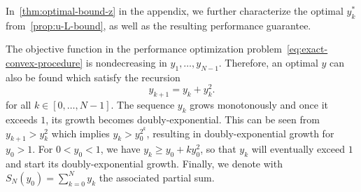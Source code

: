 \documentclass{article}
\begin{document}
In~\cref{thm:optimal-bound-z} in the appendix, we further characterize the optimal $y_k^*$ from~\cref{prop:u-L-bound}, as well as the resulting performance guarantee. 
\begin{toappendix}
The objective function in the performance optimization problem~\eqref{eq:exact-convex-procedure} is nondecreasing in $y_1,\dots,y_{N-1}$. Therefore, an optimal $y$ can also be found which satisfy the recursion
\begin{equation}\label{eq:y-recursion}
  y_{k+1}=y_k+y_k^2.
\end{equation}
for all $k\in [0, \dots, N-1]$.
The sequence $y_k$ grows monotonously and once it exceeds $1$, its growth becomes doubly-exponential. This can be seen from $y_{k+1}> y_{k}^2$ which implies $y_{k}>y_{0}^{2^k}$, resulting in doubly-exponential growth for $y_{0}>1$. For $0<y_0<1$, we have $y_k\ge y_0+ky_0^2$, so that $y_k$ will eventually exceed $1$ and start its doubly-exponential growth. Finally, we denote with $S_N(y_0)=\sum_{k=0}^Ny_k$ the associated partial sum.


\end{toappendix}
\end{document}
